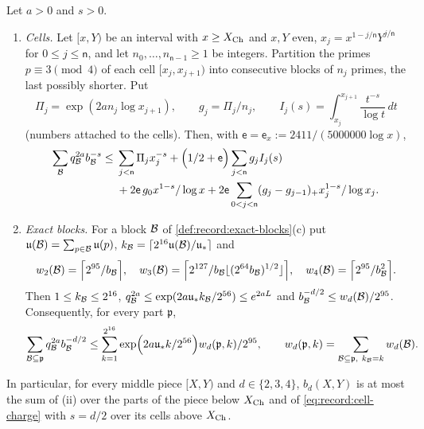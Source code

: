 \begin{lemma}\label{lem:record:block-charge}
Let $a>0$ and $s>0$.
\begin{enumerate}[label=(\roman*)]
\item \emph{Cells.} Let $[x,Y)$ be an interval with $x\ge X_{\rm Ch}$ and
 $x,Y$ even, $x_j=x^{1-j/\mathsf n}Y^{j/\mathsf n}$ for $0\le j\le\mathsf n$,
 and let $n_0,\dots,n_{\mathsf n-1}\ge1$ be integers. Partition the primes
 $p\equiv3\pmod4$ of each cell $[x_j,x_{j+1})$ into consecutive blocks of
 $n_j$ primes, the last possibly shorter. Put
 \[
  \Pi_j=\exp(2an_j\log x_{j+1}),\qquad g_j=\Pi_j/n_j,\qquad
  I_j(s)=\int_{x_j}^{x_{j+1}}\frac{t^{-s}}{\log t}\,dt
 \]
 (numbers attached to the cells). Then, with
$\mathsf e=\mathsf e_x:=2411/(5000000\log x)$,
 \begin{equation}\label{eq:record:cell-charge}
 \begin{split}
  \sum_{\mathcal B}q_{\mathcal B}^{2a}b_{\mathcal B}^{-s}\le{}&\sum_{j<\mathsf n}\Pi_jx_j^{-s}
   +\Bigl(1/2+\mathsf e\Bigr)\sum_{j<\mathsf n}g_jI_j(s)\\
   &+2\mathsf e\,g_0x^{1-s}/\log x
   +2\mathsf e\sum_{0<j<\mathsf n}(g_j-g_{j-1})_+x_j^{1-s}/\log x_j.
 \end{split}
 \end{equation}
\item \emph{Exact blocks.} For a block $\mathcal B$ of
 \cref{def:record:exact-blocks}(c) put
 $\mathfrak u(\mathcal B)=\sum_{p\in\mathcal B}\mathfrak u(p)$,
 $k_{\mathcal B}=\lceil2^{16}\mathfrak u(\mathcal B)/\mathfrak u_*\rceil$ and
 \[
  w_2(\mathcal B)=\Bigl\lceil2^{95}/b_{\mathcal B}\Bigr\rceil,\quad
  w_3(\mathcal B)=\Bigl\lceil2^{127}/b_{\mathcal B}\lfloor(2^{64}b_{\mathcal B})^{1/2}
  \rfloor\Bigr\rceil,\quad
  w_4(\mathcal B)=\Bigl\lceil2^{95}/b_{\mathcal B}^2\Bigr\rceil.
 \]
 Then $1\le k_{\mathcal B}\le2^{16}$,
 $q_{\mathcal B}^{2a}\le\exp(2a\mathfrak u_*k_{\mathcal B}/2^{56})\le e^{2aL}$ and
 $b_{\mathcal B}^{-d/2}\le w_d(\mathcal B)/2^{95}$. Consequently, for every part
 $\mathfrak p$,
 \[
  \sum_{\Blk\subseteq\mathfrak p}q_{\Blk}^{2a}b_{\Blk}^{-d/2}\le
  \sum_{k=1}^{2^{16}}\exp\Bigl(\frac{2a\mathfrak u_*k}{2^{56}}\Bigr)
  \frac{w_d(\mathfrak p,k)}{2^{95}},\qquad
  w_d(\mathfrak p,k)=\sum_{\Blk\subseteq\mathfrak p,\ k_{\Blk}=k}w_d(\Blk).
 \]
\end{enumerate}
In particular, for every middle piece $[X,Y)$ and $d\in\{2,3,4\}$,
$b_d(X,Y)$ is at most the sum of (ii) over the parts of the piece below
$X_{\rm Ch}$ and of \eqref{eq:record:cell-charge} with $s=d/2$ over its cells
above $X_{\rm Ch}$.
\end{lemma}


